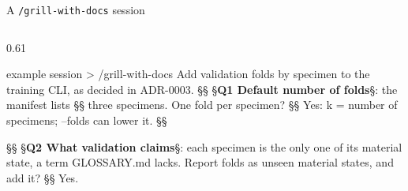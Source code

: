 \begin{frame}[fragile,source={Pocock (2026), mattpocock/skills v1.3.1: grill-with-docs, grilling, domain-modeling · video of 16 Jul 2026}]{A \texttt{/grill-with-docs} session}
  \edef\colgap{\the\dimexpr0.03\textwidth\relax}
  \begin{columns}[T,onlytextwidth]
    \begin{column}{0.61\textwidth}
\begin{terminal}[basicstyle=\ttfamily\fontsize{7}{8}\selectfont]{example session}
> /grill-with-docs Add validation folds by specimen to the
  training CLI, as decided in ADR-0003.
§\textcolor{termred}{\smash{\faQuestionCircle}}§ §\textbf{Q1 Default number of folds}§: the manifest lists §§
  three specimens. One fold per specimen?
§\textcolor{termblue}{\smash{\faArrowRight}}§ Yes: k = number of specimens; --folds can lower it. §§

§\textcolor{termred}{\smash{\faQuestionCircle}}§ §\textbf{Q2 What validation claims}§: each specimen is the only
  one of its material state, a term GLOSSARY.md lacks.
  Report folds as unseen material states, and add it?
§\textcolor{termblue}{\smash{\faArrowRight}}§ Yes.


\end{terminal}
\end{column}
\end{columns}
\end{frame}
